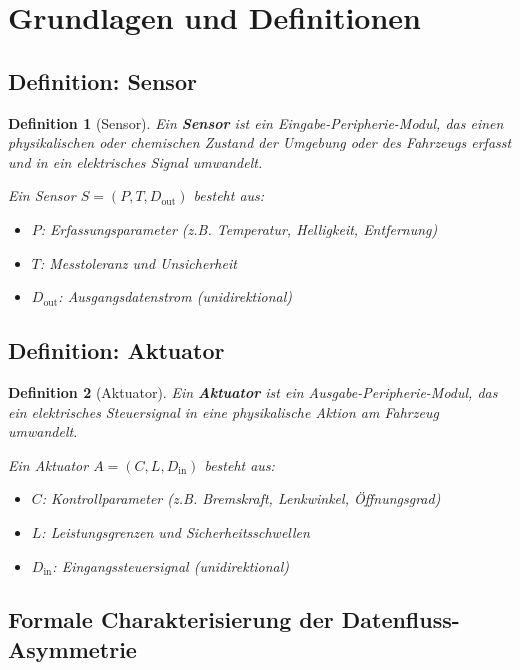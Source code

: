 ﻿\documentclass[a4paper,12pt]{article}
\newtheorem{definition}{Definition}
\begin{document}
\section{Grundlagen und Definitionen}

\subsection{Definition: Sensor}

\begin{definition}[Sensor]
Ein \textbf{Sensor} ist ein Eingabe-Peripherie-Modul, das einen physikalischen oder 
chemischen Zustand der Umgebung oder des Fahrzeugs erfasst und in ein elektrisches Signal 
umwandelt.

Ein Sensor $S = (P, T, D_{\text{out}})$ besteht aus:
\begin{itemize}
	\item $P$: Erfassungsparameter (z.B. Temperatur, Helligkeit, Entfernung)
	\item $T$: Messtoleranz und Unsicherheit
	\item $D_{\text{out}}$: Ausgangsdatenstrom (unidirektional)
\end{itemize}
\end{definition}

\subsection{Definition: Aktuator}

\begin{definition}[Aktuator]
Ein \textbf{Aktuator} ist ein Ausgabe-Peripherie-Modul, das ein elektrisches Steuersignal 
in eine physikalische Aktion am Fahrzeug umwandelt.

Ein Aktuator $A = (C, L, D_{\text{in}})$ besteht aus:
\begin{itemize}
	\item $C$: Kontrollparameter (z.B. Bremskraft, Lenkwinkel, Öffnungsgrad)
	\item $L$: Leistungsgrenzen und Sicherheitsschwellen
	\item $D_{\text{in}}$: Eingangssteuersignal (unidirektional)
\end{itemize}
\end{definition}

\subsection{Formale Charakterisierung der Datenfluss-Asymmetrie}
\end{document}
